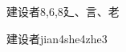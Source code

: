 \begin{entry}{建设者}{8,6,8}{⼵、⾔、⽼}
  \begin{phonetics}{建设者}{jian4she4zhe3}
  \end{phonetics}
\end{entry}
